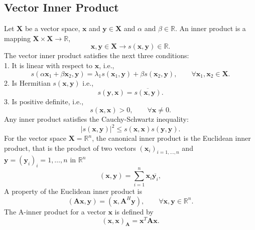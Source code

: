 \documentclass[12pt]{report}
\begin{document}
\subsection*{Vector Inner Product}
Let $\mathbf{X}$ be a vector space, $\mathbf{x}$ and $\mathbf{y}\in \mathbf{X}$ and $\alpha$ and $\beta\in\mathbb{R}$. An inner product is a mapping  $\mathbf{X}  \times \mathbf{X}\xrightarrow{}\mathbb{R}$,
\begin{equation}
\mathbf{x}, \mathbf{y} \in \mathbf{X} \rightarrow{} s(\mathbf{x},\mathbf{y}) \in \mathbb{R}.
\end{equation}
The vector inner product satisfies the next three conditions:\\
1. It is linear with respect to $\mathbf{x}$, i.e.,
\begin{equation*}
 s( \alpha\mathbf{x}_1+ \beta\mathbf{x}_2,\mathbf{y})= \lambda _1 s(\mathbf{x}_1,\mathbf{y})+ \beta s(\mathbf{x}_2,\mathbf{y}), \qquad \forall\mathbf{x}_1,\mathbf{x}_2 \in \mathbf{X}.
\end{equation*}
2. Is Hermitian $s(\mathbf{x},\mathbf{y})$ i.e.,
\begin{equation*}
 s(\mathbf{y},\mathbf{x})= \overline{s(\mathbf{x},\mathbf{y})}.
\end{equation*}
3. Is positive definite, i.e.,
\begin{equation*}
 s(\mathbf{x},\mathbf{x})>0, \qquad \forall\mathbf{x} \neq 0.
\end{equation*}
Any inner product satisfies the Cauchy-Schwartz inequality:
\begin{equation*}
|s(\mathbf{x},\mathbf{y})|^2 \leq s(\mathbf{x},\mathbf{x})s(\mathbf{y},\mathbf{y}).
\end{equation*}
For the vector space $\mathbf{X}= \mathbb{R}^n$, the canonical inner product is the
Euclidean inner product, that is the product of two vectors $(\mathbf{x}_i)_{i=1,\dots ,n}$ and $\mathbf{y}=(\mathbf{y}_i)_i=1,\dots,n$ in $\mathbb{R}^n$
\begin{equation*}
 (\mathbf{x},\mathbf{y})=\sum_{i=1}^n\mathbf{x}_i\overline{\mathbf{y}_i},
\end{equation*}
A property of the Euclidean inner product is
\begin{equation*}
 (\mathbf{A}\mathbf{x},\mathbf{y})=(\mathbf{x},\mathbf{A}^H\mathbf{y}), \qquad \forall\mathbf{x},\mathbf{y} \in \mathbb{R}^n.
\end{equation*}
The A-inner product for a vector $\mathbf{x}$ is defined by
\begin{equation} \label{Aip}
 (\mathbf{x},\mathbf{x})_\mathbf{A}=\mathbf{x}^T\mathbf{A}\mathbf{x}. 
\end{equation}
\end{document}
